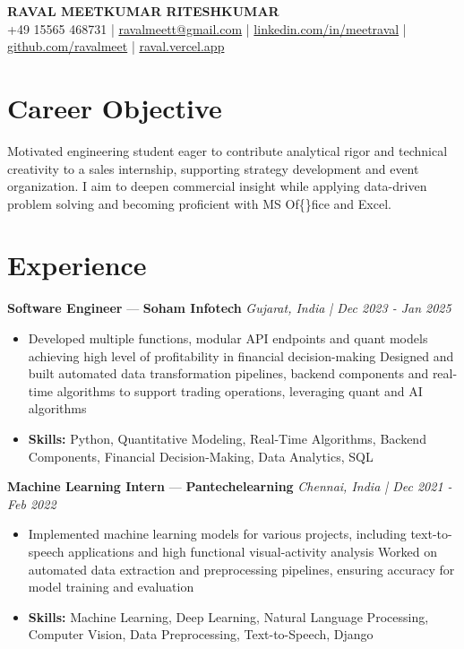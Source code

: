 \documentclass[a4paper,10pt]{article}
\begin{document}
\begin{center}
  {\Large\bfseries RAVAL MEETKUMAR RITESHKUMAR}\\[2pt]
  {\small +49 15565 468731 \;|\; \href{mailto:ravalmeett@gmail.com}{ravalmeett@gmail.com} \;|\; \href{https://www.linkedin.com/in/meetraval/}{linkedin.com/in/meetraval} \;|\; \href{https://github.com/ravalmeet}{github.com/ravalmeet} \;|\; \href{https://raval.vercel.app/}{raval.vercel.app}}
\end{center}
\vspace{-3pt}

\section*{Career Objective}
Motivated engineering student eager to contribute analytical rigor and technical creativity to a sales internship, supporting strategy development and event organization. I aim to deepen commercial insight while applying data-driven problem solving and becoming proficient with MS Of\{\}fice and Excel.\par

\section*{Experience}
\textbf{Software Engineer} — \textbf{Soham Infotech} \hfill \textit{Gujarat, India \;|\; Dec 2023 - Jan 2025}\par
\vspace{1pt}
\begin{itemize}
  \item Developed multiple functions, modular API endpoints and quant models achieving high level of profitability in financial decision-making Designed and built automated data transformation pipelines, backend components and real-time algorithms to support trading operations, leveraging quant and AI algorithms
  \item \textbf{Skills:} Python, Quantitative Modeling, Real-Time Algorithms, Backend Components, Financial Decision-Making, Data Analytics, SQL
\end{itemize}
\vspace{3pt}
\textbf{Machine Learning Intern} — \textbf{Pantechelearning} \hfill \textit{Chennai, India \;|\; Dec 2021 - Feb 2022}\par
\vspace{1pt}
\begin{itemize}
  \item Implemented machine learning models for various projects, including text-to-speech applications and high functional visual-activity analysis Worked on automated data extraction and preprocessing pipelines, ensuring accuracy for model training and evaluation
  \item \textbf{Skills:} Machine Learning, Deep Learning, Natural Language Processing, Computer Vision, Data Preprocessing, Text-to-Speech, Django
\end{itemize}
\end{document}
